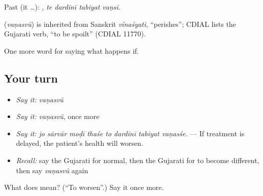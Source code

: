 Past (it …):    , \emph{te dardīnī tabiyat vaṇsī}.

\begin{cousinweb}
\textbf{} (\emph{vaṇasvũ}) is inherited from Sanskrit \emph{vínaśyati}, \textquotedblleft{}perishes\textquotedblright{}; CDIAL lists the Gujarati verb, \textquotedblleft{}to be spoilt\textquotedblright{} (CDIAL 11770).
\end{cousinweb}

\begin{grammarlens}[title={What you've built}]
One more word for saying what happens if.
\end{grammarlens}

\subsection*{Your turn}
\begin{itemize}
\raggedright
  \item \emph{Say it:} \emph{vaṇasvũ}
  \item \emph{Say it:} \emph{vaṇasvũ}, once more
  \item \emph{Say it:} \emph{jo sārvār moḍī thaśe to dardīnī tabiyat vaṇasśe.} — If treatment is delayed, the patient's health will worsen.
  \item \emph{Recall:} say the Gujarati for normal, then the Gujarati for to become different, then say \emph{vaṇasvũ} again
\end{itemize}

\begin{tcolorbox}[breakable,colback=teal!4,colframe=teal!35!black,title={Before you move on}]
What does  mean? (\textquotedblleft{}To worsen\textquotedblright{}.) Say it once more.
\end{tcolorbox}
